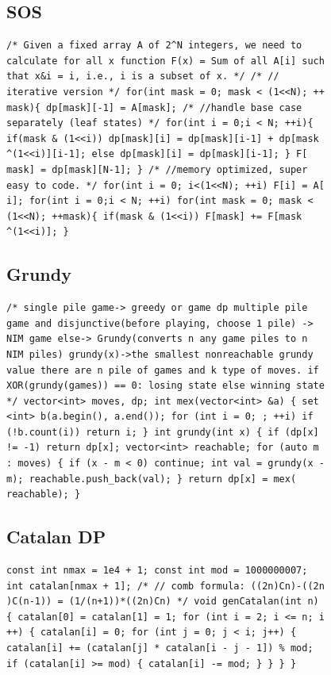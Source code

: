 \documentclass[a4paper,11pt,oneside]{article}
\begin{document}
\begin{multicols*}{\COLS}
\subsection{SOS}
\begin{lstlisting}
/* Given a fixed array A of 2^N integers, we need to
calculate for all x function F(x) = Sum of all A[i] such
that x&i = i, i.e., i is a subset of x. */ /* //
iterative version */ for(int mask = 0; mask < (1<<N); ++
mask){ dp[mask][-1] = A[mask]; /* //handle base case
separately (leaf states) */ for(int i = 0;i < N; ++i){
if(mask & (1<<i)) dp[mask][i] = dp[mask][i-1] + dp[mask
^(1<<i)][i-1]; else dp[mask][i] = dp[mask][i-1]; } F[
mask] = dp[mask][N-1]; } /* //memory optimized, super
easy to code. */ for(int i = 0; i<(1<<N); ++i) F[i] = A[
i]; for(int i = 0;i < N; ++i) for(int mask = 0; mask <
(1<<N); ++mask){ if(mask & (1<<i)) F[mask] += F[mask
^(1<<i)]; }
\end{lstlisting}
\subsection{Grundy}
\begin{lstlisting}
/* single pile game-> greedy or game dp multiple pile
game and disjunctive(before playing, choose 1 pile) ->
NIM game else-> Grundy(converts n any game piles to n
NIM piles) grundy(x)->the smallest nonreachable grundy
value there are n pile of games and k type of moves. if
XOR(grundy(games)) == 0: losing state else winning state
*/ vector<int> moves, dp; int mex(vector<int> &a) { set
<int> b(a.begin(), a.end()); for (int i = 0; ; ++i) if
(!b.count(i)) return i; } int grundy(int x) { if (dp[x]
!= -1) return dp[x]; vector<int> reachable; for (auto m
: moves) { if (x - m < 0) continue; int val = grundy(x -
m); reachable.push_back(val); } return dp[x] = mex(
reachable); }
\end{lstlisting}
\subsection{Catalan DP}
\begin{lstlisting}
const int nmax = 1e4 + 1; const int mod = 1000000007;
int catalan[nmax + 1]; /* // comb formula: ((2n)Cn)-((2n
)C(n-1)) = (1/(n+1))*((2n)Cn) */ void genCatalan(int n)
{ catalan[0] = catalan[1] = 1; for (int i = 2; i <= n; i
++) { catalan[i] = 0; for (int j = 0; j < i; j++) {
catalan[i] += (catalan[j] * catalan[i - j - 1]) % mod;
if (catalan[i] >= mod) { catalan[i] -= mod; } } } }
\end{lstlisting}

\end{multicols*}
\end{document}
